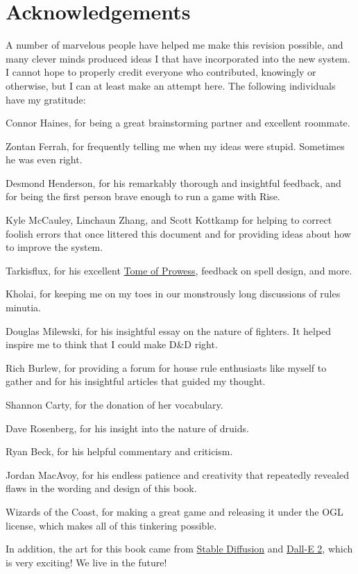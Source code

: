 \chapter*{Acknowledgements}
A number of marvelous people have helped me make this revision possible, and many clever minds produced ideas I that have incorporated into the new system. I cannot hope to properly credit everyone who contributed, knowingly or otherwise, but I can at least make an attempt here. The following individuals have my gratitude:

Connor Haines, for being a great brainstorming partner and excellent roommate.

Zontan Ferrah, for frequently telling me when my ideas were stupid. Sometimes he was even right.

Desmond Henderson, for his remarkably thorough and insightful feedback, and for being the first person brave enough to run a game with Rise.

Kyle McCauley, Linchaun Zhang, and Scott Kottkamp for helping to correct foolish errors that once littered this document and for providing ideas about how to improve the system.

Tarkisflux, for his excellent \href{http://dnd-wiki.org/wiki/Tome_of_Prowess_(3.5e_Sourcebook)}{Tome of Prowess}, feedback on spell design, and more.

Kholai, for keeping me on my toes in our monstrously long discussions of rules minutia.

Douglas Milewski, for his insightful essay on the nature of fighters. It helped inspire me to think that I could make D\&D right.

Rich Burlew, for providing a forum for house rule enthusiasts like myself to gather and for his insightful articles that guided my thought.

Shannon Carty, for the donation of her vocabulary.

Dave Rosenberg, for his insight into the nature of druids.

Ryan Beck, for his helpful commentary and criticism.

Jordan MacAvoy, for his endless patience and creativity that repeatedly revealed flaws in the wording and design of this book.

Wizards of the Coast, for making a great game and releasing it under the OGL license, which makes all of this tinkering possible.

In addition, the art for this book came from \href{https://huggingface.co/spaces/stabilityai/stable-diffusion}{Stable Diffusion} and \href{https://openai.com/dall-e-2/}{Dall-E 2}, which is very exciting! We live in the future!
